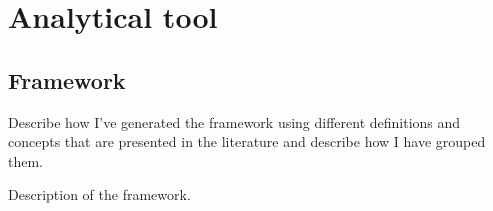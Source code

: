 
\chapter{Analytical tool} %

\label{Chapter4} %




\section{Framework}


Describe how I’ve generated the framework using different definitions and concepts that are presented in the literature and describe how I have grouped them.

Description of the framework.

